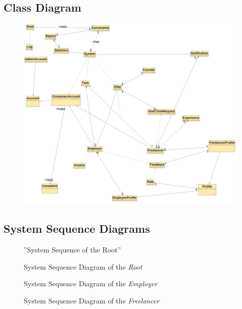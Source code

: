 \documentclass{article}
\begin{document}
\subsection{Class Diagram}
\begin{figure}[ht!]
\centering
\includegraphics[width=128mm]{ClassDiagram_Version1}
\end{figure}





\newpage
\subsection{System Sequence Diagrams}

\begin{figure}[ht!]
\centering
\caption{''System Sequence of the Root''}
\end{figure}

\begin{figure}[ht!]
\centering
\caption{System Sequence Diagram of the \textit{Root}}
\end{figure}

\begin{figure}[ht!]
\centering
\caption{System Sequence Diagram of the \textit{Employer}}
\end{figure}


\begin{figure}[ht!]
\centering
\caption{System Sequence Diagram of the \textit{Freelancer}}
\end{figure}
\end{document}

